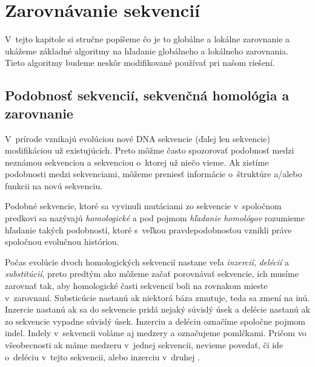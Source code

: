 \chapter{Zarovnávanie sekvencií}
\label{chap:alignment}

V~tejto kapitole si stručne popíšeme čo je to globálne a lokálne zarovnanie a ukážeme základné algoritmy na hľadanie globálneho a lokálneho zarovnania. Tieto algoritmy budeme neskôr modifikované používať pri našom riešení.

\section[Podobnosť sekvencií]{Podobnosť sekvencií, sekvenčná homológia a zarovnanie}
V~prírode vznikajú evolúciou nové DNA sekvencie (ďalej len sekvencie) modifikáciou už existujúcich. Preto môžme často spozorovať podobnosť medzi neznámou sekvenciou a sekvenciou o~ktorej už niečo vieme. Ak zistíme podobnosti medzi sekvenciami, môžeme preniesť informácie o~štruktúre a/alebo funkcii na novú sekvenciu.

Podobné sekvencie, ktoré sa vyvinuli mutáciami zo sekvencie v~spoločnom predkovi sa nazývajú \textit{homologické} a pod pojmom \textit{hľadanie homológov} rozumieme hľadanie takých podobností, ktoré s~veľkou pravdepodobnosťou vznikli práve spoločnou evolučnou históriou.



Počas evolúcie dvoch homologických sekvencií nastane veľa \textit{inzercií}, \textit{delécií} a \textit{substitúcií}, preto predtým ako môžeme začať porovnávať sekvencie, ich musíme zarovnať tak, aby homologické časti sekvencií boli na rovnakom mieste v~zarovnaní. Substicúcie nastanú ak niektorá báza zmutuje, teda sa zmení na inú. Inzercie nastanú ak sa do sekvencie pridá nejaký súvislý úsek a delécie nastanú ak zo sekvencie vypadne súvislý úsek. Inzerciu a deléciu označíme spoločne pojmom indel. Indely v~sekvencii voláme aj medzery a označujeme pomlčkami. Pričom vo všeobecnosti ak máme medzeru v~jednej sekvencii, nevieme povedať, či ide o~deléciu v~tejto sekvencii, alebo inzerciu v~druhej \cite{durbin, skripta}.

